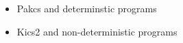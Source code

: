 
\begin{itemize}
    \item Pakcs and determinstic programs
    \item Kics2 and non-deterministic programs
\end{itemize}
